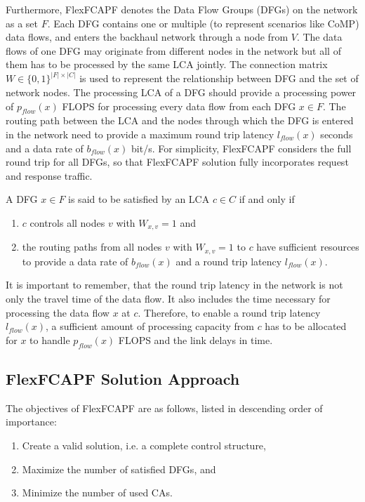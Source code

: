 Furthermore, FlexFCAPF denotes the Data Flow Groups (DFGs) on the network as a set $F$. Each DFG contains one or multiple (to represent scenarios like CoMP) data flows, and enters the backhaul network through a node from $V$. The data flows of one DFG may originate from different nodes in the network but all of them has to be processed by the same LCA jointly. The connection matrix $W \in \{ 0, 1 \}^{| F | \times | C |}$ is used to represent the relationship between DFG and the set of network nodes. The processing LCA of a DFG should provide a processing power of $p_{flow} ( x )$ FLOPS for processing every data flow from each DFG $x \in F$. The routing path between the LCA and the nodes through which the DFG is entered in the network need to provide a maximum round trip latency $l_{flow} ( x )$ seconds and a data rate of $b_{flow} ( x )$ bit/s. For simplicity, FlexFCAPF considers the full round trip for all DFGs, so that FlexFCAPF solution fully incorporates request and response traffic.

A DFG $x \in F$ is said to be satisfied by an LCA $c \in C$ if and only if
\begin{enumerate}
	\item $c$ controls all nodes $v$ with $W_{x,v} = 1$ and
	\item the routing paths from all nodes $v$ with $W_{x,v} = 1$ to $c$ have sufficient resources to provide a data rate of $b_{flow} ( x )$ and a round trip latency $l_{flow} ( x )$.
\end{enumerate}

It is important to remember, that the round trip latency in the network is not only the travel time of the data flow. It also includes the time necessary for processing the data flow $x$ at $c$. Therefore, to enable a round trip latency $l_{flow} ( x )$, a sufficient amount of processing capacity from $c$ has to be allocated for $x$ to handle $p_{flow} ( x )$ FLOPS and the link delays in time.

\subsection{FlexFCAPF Solution Approach}
The objectives of FlexFCAPF are as follows, listed in descending order of importance:
\begin{enumerate}
	\item Create a valid solution, i.e. a complete control structure,
	\item Maximize the number of satisfied DFGs, and
	\item Minimize the number of used CAs.
\end{enumerate}

